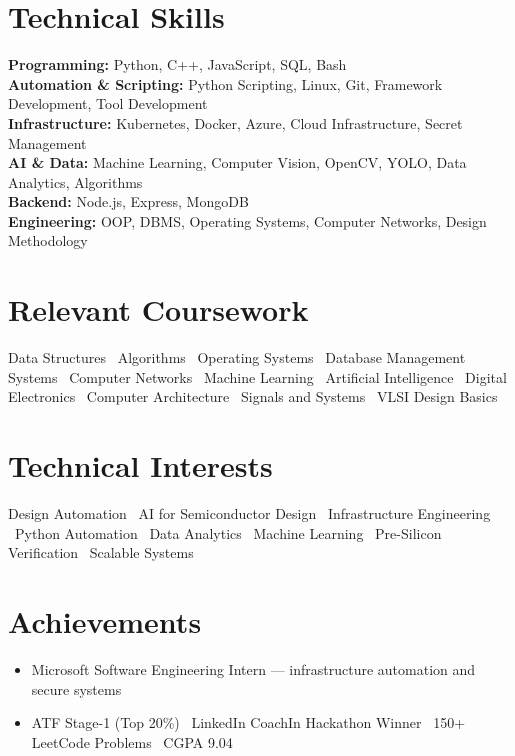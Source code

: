 \documentclass[letterpaper,10pt]{article}
\newcommand{\resumeItem}[1]{\item\small{#1}}
\begin{document}
\section{Technical Skills}
\begin{itemize}[leftmargin=0.05in, label={}]
  \small{\item{
    \textbf{Programming:} Python, C++, JavaScript, SQL, Bash \\
    \textbf{Automation \& Scripting:} Python Scripting, Linux, Git, Framework Development, Tool Development \\
    \textbf{Infrastructure:} Kubernetes, Docker, Azure, Cloud Infrastructure, Secret Management \\
    \textbf{AI \& Data:} Machine Learning, Computer Vision, OpenCV, YOLO, Data Analytics, Algorithms \\
    \textbf{Backend:} Node.js, Express, MongoDB \\
    \textbf{Engineering:} OOP, DBMS, Operating Systems, Computer Networks, Design Methodology
  }}
\end{itemize}

\section{Relevant Coursework}
\small{Data Structures \textbullet\ Algorithms \textbullet\ Operating Systems \textbullet\ Database Management Systems \textbullet\ Computer Networks \textbullet\ Machine Learning \textbullet\ Artificial Intelligence \textbullet\ Digital Electronics \textbullet\ Computer Architecture \textbullet\ Signals and Systems \textbullet\ VLSI Design Basics}

\section{Technical Interests}
\small{Design Automation \textbullet\ AI for Semiconductor Design \textbullet\ Infrastructure Engineering \textbullet\ Python Automation \textbullet\ Data Analytics \textbullet\ Machine Learning \textbullet\ Pre-Silicon Verification \textbullet\ Scalable Systems}

\section{Achievements}
\begin{itemize}[leftmargin=0.15in]
  \resumeItem{Microsoft Software Engineering Intern --- infrastructure automation and secure systems}
  \resumeItem{ATF Stage-1 (Top 20\%) \textbullet\ LinkedIn CoachIn Hackathon Winner \textbullet\ 150+ LeetCode Problems \textbullet\ CGPA 9.04}
\end{itemize}
\end{document}
